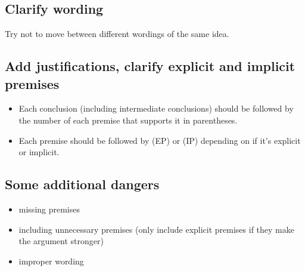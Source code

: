 \subsection{Clarify wording}

Try not to move between different wordings of the same idea.

\subsection{Add justifications, clarify explicit and implicit premises}

\begin{itemize}
    \item Each conclusion (including intermediate conclusions) should be
        followed by the number of each premise that supports it in
        parentheses.
    \item Each premise should be followed by (EP) or (IP) depending on if
        it's explicit or implicit.
\end{itemize}

\subsection{Some additional dangers}

\begin{itemize}
    \item missing premises
    \item including unnecessary premises (only include explicit premises if
        they make the argument stronger)
    \item improper wording
\end{itemize}

